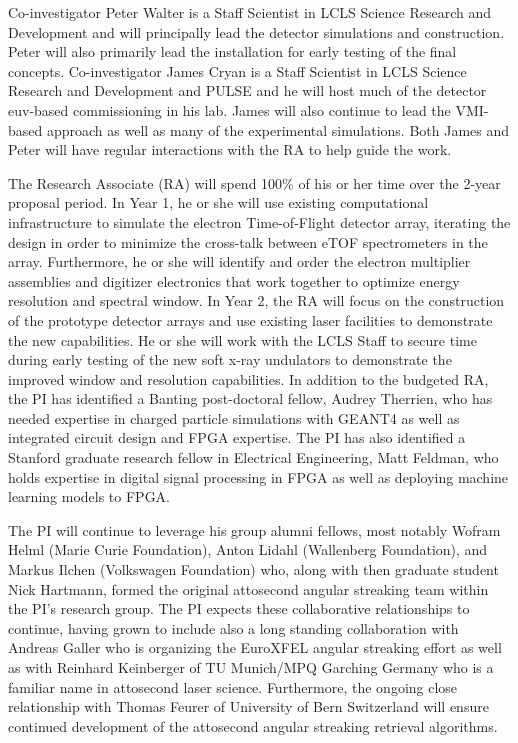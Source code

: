 Co-investigator Peter Walter is a Staff Scientist in LCLS Science Research and Development and will principally lead the detector simulations and construction.
Peter will also primarily lead the installation for early testing of the final concepts.
Co-investigator James Cryan is a Staff Scientist in LCLS Science Research and Development and PULSE and he will host much of the detector euv-based commissioning in his lab.
James will also continue to lead the VMI-based approach as well as many of the experimental simulations.
Both James and Peter will have regular interactions with the RA to help guide the work.

The Research Associate (RA) will spend 100\% of his or her time over the 2-year proposal period.  
In Year 1, he or she will use existing computational infrastructure to simulate the electron Time-of-Flight detector array, iterating the design in order to minimize the cross-talk between eTOF spectrometers in the array.  
Furthermore, he or she will identify and order the electron multiplier assemblies and digitizer electronics that work together to optimize energy resolution and spectral window.  
In Year 2, the RA will focus on the construction of the prototype detector arrays and use existing laser facilities to demonstrate the new capabilities.  
He or she will work with the LCLS Staff to secure time during early testing of the new soft x-ray undulators to demonstrate the improved window and resolution capabilities.
In addition to the budgeted RA, the PI has identified a Banting post-doctoral fellow, Audrey Therrien, who has needed expertise in charged particle simulations with GEANT4 as well as integrated circuit design and FPGA expertise.
The PI has also identified a Stanford graduate research fellow in Electrical Engineering, Matt Feldman, who holds expertise in digital signal processing in FPGA as well as deploying machine learning models to FPGA.

The PI will continue to leverage his group alumni fellows, most notably Wofram Helml (Marie Curie Foundation), Anton Lidahl (Wallenberg Foundation), and Markus Ilchen (Volkswagen Foundation) who, along with then graduate student Nick Hartmann, formed the original attosecond angular streaking team within the PI's research group.
The PI expects these collaborative relationships to continue, having grown to include also a long standing collaboration with Andreas Galler who is organizing the EuroXFEL angular streaking effort as well as with Reinhard Keinberger of TU Munich/MPQ Garching Germany who is a familiar name in attosecond laser science.
Furthermore, the ongoing close relationship with Thomas Feurer of University of Bern Switzerland will ensure continued development of the attosecond angular streaking retrieval algorithms.

